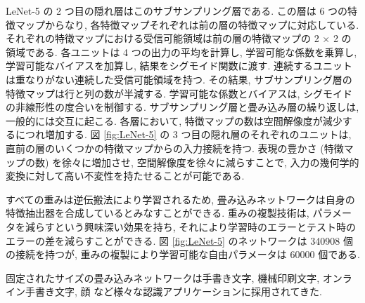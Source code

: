 \documentclass[twocolumn]{jarticle}     %
\begin{document}
LeNet-5 の 2 つ目の隠れ層はこのサブサンプリング層である. この層は 6 つの特徴マップからなり, 各特徴マップそれぞれは前の層の特徴マップに対応している. それぞれの特徴マップにおける受信可能領域は前の層の特徴マップの 2 × 2 の領域である. 各ユニットは 4 つの出力の平均を計算し, 学習可能な係数を乗算し, 学習可能なバイアスを加算し, 結果をシグモイド関数に渡す. 連続するユニットは重なりがない連続した受信可能領域を持つ. その結果, サブサンプリング層の特徴マップは行と列の数が半減する. 学習可能な係数とバイアスは, シグモイドの非線形性の度合いを制御する.
サブサンプリング層と畳み込み層の繰り返しは, 一般的には交互に起こる. 各層において, 特徴マップの数は空間解像度が減少するにつれ増加する. 図 \ref{fig:LeNet-5} の 3 つ目の隠れ層のそれぞれのユニットは, 直前の層のいくつかの特徴マップからの入力接続を持つ.
表現の豊かさ (特徴マップの数) を徐々に増加させ, 空間解像度を徐々に減らすことで, 入力の幾何学的変換に対して高い不変性を持たせることが可能である.
\par 
すべての重みは逆伝搬法により学習されるため, 畳み込みネットワークは自身の特徴抽出器を合成しているとみなすことができる. 重みの複製技術は, パラメータを減らすという興味深い効果を持ち, それにより学習時のエラーとテスト時のエラーの差を減らすことができる. 図 \ref{fig:LeNet-5} のネットワークは 340908 個の接続を持つが, 重みの複製により学習可能な自由パラメータは 60000 個である.
\par
固定されたサイズの畳み込みネットワークは手書き文字, 機械印刷文字, オンライン手書き文字, 顔 など様々な認識アプリケーションに採用されてきた. 
\end{document}
